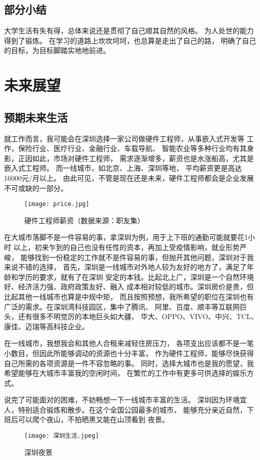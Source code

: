 \documentclass[AutoFakeBold]{LZUThesis}
\begin{document}
\section{部分小结}
大学生活有失有得，总体来说还是贯彻了自己顺其自然的风格。
为人处世的能力得到了锻炼。
在学习的道路上坎坎坷坷，也总算是走出了自己的路，
明确了自己的目标，为目标脚踏实地地前进。


\chapter{未来展望}
\section{预期未来生活}
就工作而言，我可能会在深圳选择一家公司做硬件工程师，从事嵌入式开发等
工作，保险行业、医疗行业、金融行业、车载导航、
智能农业等多种行业均有其身影，正因如此，市场对硬件工程师，
需求逐渐增多，薪资也是水涨船高，尤其是嵌入式工程师。
而一线城市，如北京、上海、深圳等地，
平均薪资更是高达16000元/月以上。
由此可见，不管是现在还是未来，硬件工程师都会是企业发展不可或缺的一部分。

\begin{figure}[htbp]
    \centering
    \texttt{[image: price.jpg]}
    \caption{硬件工程师薪资（数据来源：职友集）}
\end{figure}

在大城市落脚不是一件容易的事，拿深圳为例，用于上下班的通勤可能就要花1小时
以上，初来乍到的自己也没有任性的资本，再加上受疫情影响，就业形势严峻，
能够找到一份稳定的工作就不是件容易的事，但抛开其他问题，深圳对于我来说不错的选择，
首先，深圳是一线城市对外地人较为友好的地方了，满足了年龄和学历的要求，就有了在深圳
安定的本钱。比起北上广，深圳是一个自然环境好、经济活力强、政府政策友好、融入
成本相对较低的城市。深圳房价是贵，但比起其他一线城市也算是中规中矩，
而且按照预想，我所希望的职位在深圳也有广泛的需求。在深圳湾科技园区，集中了腾讯、
阿里、百度、顺丰等互联网巨头，还有很多不明觉厉的本地巨头如大疆、
华大、OPPO、VIVO、中兴、TCL、康佳、迈瑞等高科技企业。

在一线城市，我想我会和其他人合租来减轻住房压力，
各项支出应该都不是一笔小数目，但因此所能够调动的资源也十分丰富，
作为硬件工程师，能够尽快获得自己所需的各项资源是一件不容忽略的事。
同时，选择大城市也是我的愿望，我希望能够在大城市丰富我的空闲时间，
在繁忙的工作中有更多可供选择的娱乐方式。

说完了可能面对的困难，不妨畅想一下一线城市丰富的生活。
深圳因为环境宜人，特别适合锻炼和散步。在这个全国公园最多的城市，
能够充分亲近自然，下班后可以爬个夜山，不拍晒黑又能在山顶看到
夜景。
\begin{figure}[htbp]
    \centering
    \texttt{[image: 深圳生活.jpeg]}
    \caption{深圳夜景}
\end{figure}
\end{document}
